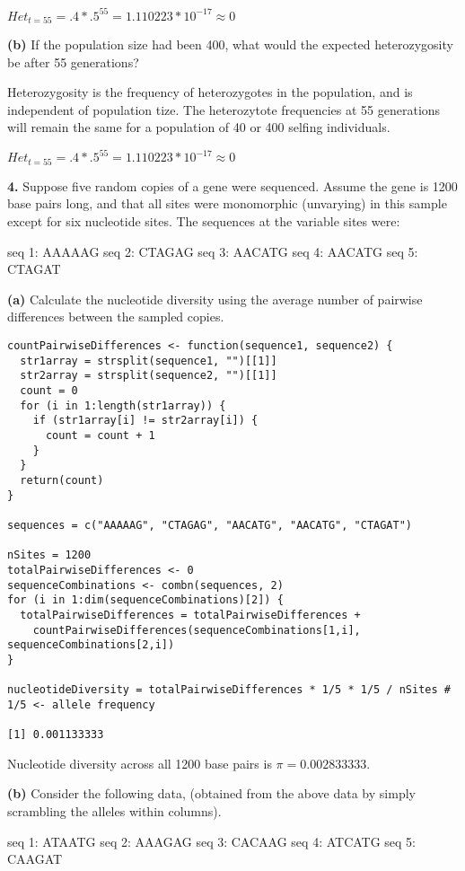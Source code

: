 \documentclass{essay}
\begin{document}
\begin{essaystyle}
$Het_{t=55} = .4 * .5^{55} = 1.110223 * 10^{-17} \approx 0$

\textbf{(b)} If the population size had been 400, what would the expected heterozygosity
be after 55 generations?

Heterozygosity is the frequency of heterozygotes in the population, and is
independent of population tize. The heterozytote frequencies at 55 generations
will remain the same for a population of 40 or 400 selfing individuals.

$Het_{t=55} = .4 * .5^{55} = 1.110223 * 10^{-17} \approx 0$


\textbf{4.} Suppose five random copies of a gene were sequenced. Assume the
gene is 1200 base pairs long, and that all sites were monomorphic (unvarying)
in this sample except for six nucleotide sites. The sequences at the variable
sites were: 

seq 1: AAAAAG seq 2: CTAGAG seq 3: AACATG seq 4: AACATG seq 5: CTAGAT 

\textbf{(a)} Calculate the nucleotide diversity using the average number of pairwise
differences between the sampled copies. 

\begin{verbatim}
countPairwiseDifferences <- function(sequence1, sequence2) {
  str1array = strsplit(sequence1, "")[[1]]
  str2array = strsplit(sequence2, "")[[1]]
  count = 0
  for (i in 1:length(str1array)) {
    if (str1array[i] != str2array[i]) {
      count = count + 1
    }
  }
  return(count)
}

sequences = c("AAAAAG", "CTAGAG", "AACATG", "AACATG", "CTAGAT")

nSites = 1200
totalPairwiseDifferences <- 0
sequenceCombinations <- combn(sequences, 2)
for (i in 1:dim(sequenceCombinations)[2]) { 
  totalPairwiseDifferences = totalPairwiseDifferences + 
    countPairwiseDifferences(sequenceCombinations[1,i], sequenceCombinations[2,i])
}

nucleotideDiversity = totalPairwiseDifferences * 1/5 * 1/5 / nSites # 1/5 <- allele frequency

[1] 0.001133333
\end{verbatim}

Nucleotide diversity across all 1200 base pairs is $\pi = 0.002833333$.

\textbf{(b)} Consider the following data, (obtained from the above data by simply
scrambling the alleles within columns). 

seq 1: ATAATG seq 2: AAAGAG seq 3: CACAAG seq 4: ATCATG seq 5: CAAGAT 


\end{essaystyle}
\end{document}
